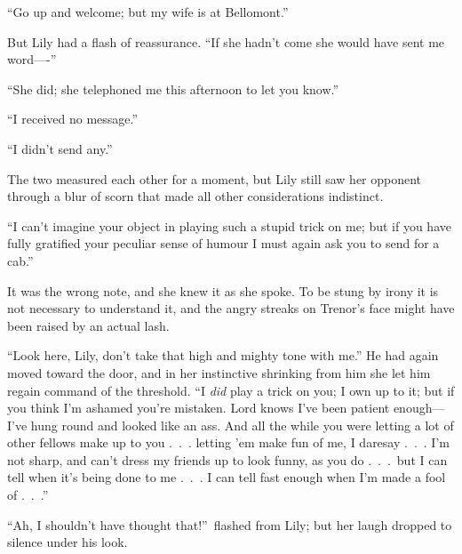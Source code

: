 \documentclass[12pt,a4paper]{book}
\begin{document}
``Go up and welcome; but my wife is at Bellomont.''





But Lily had a flash of reassurance. ``If she hadn't come she
would have sent me word----''





``She did; she telephoned me this afternoon to let you know.''





``I received no message.''





``I didn't send any.''





The two measured each other for a moment, but Lily still saw her
opponent through a blur of scorn that made all other
considerations indistinct.





``I can't imagine your object in playing such a stupid trick on
me; but if you have fully gratified your peculiar sense of humour
I must again ask you to send for a cab.''





It was the wrong note, and she knew it as she spoke. To be stung
by irony it is not necessary to understand it, and the angry
streaks on Trenor's face might have been raised by an actual
lash.





``Look here, Lily, don't take that high and mighty tone with me.'' 
He had again moved toward the door, and in her instinctive
shrinking from him she let him regain command of the threshold. 
``I \textit{did} play a trick on you; I own up to it; but if you think I'm
ashamed you're mistaken. Lord knows I've been patient
enough---I've hung round and looked like an ass. And all the while
you were letting a lot of other fellows make up to you .\ .\ .
letting 'em make fun of me, I daresay .\ .\ . I'm not sharp, and
can't dress my friends up to look funny, as you do .\ .\ .\ but I
can tell when it's being done to me .\ .\ . I can tell fast enough
when I'm made a fool of .\ .\ .''





``Ah, I shouldn't have thought that!''\ flashed from Lily; but her
laugh dropped to silence under his look.
\end{document}
